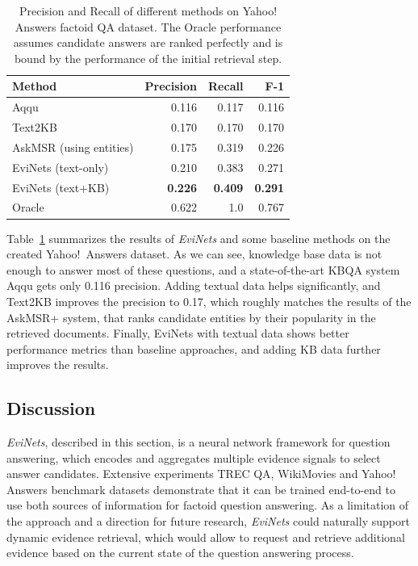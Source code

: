 \begin{table}
\centering
\begin{tabular}{p{6cm}rrr}
Method & Precision & Recall & F-1 \\
\hline
Aqqu & 0.116 & 0.117 & 0.116 \\
Text2KB & 0.170 & 0.170 & 0.170 \\
AskMSR (using entities) & 0.175 & 0.319 & 0.226 \\
\hline
EviNets (text-only) & 0.210 & 0.383 & 0.271 \\
EviNets (text+KB) & \textbf{0.226} & \textbf{0.409} & \textbf{0.291} \\
\hline
Oracle & 0.622 & 1.0 & 0.767 \\
\end{tabular}
\caption{Precision and Recall of different methods on Yahoo! Answers factoid QA dataset. The Oracle performance assumes candidate answers are ranked perfectly and is bound by the performance of the initial retrieval step.}
\label{table:factoid:evinet:eval:yahoo}
\end{table}

Table~\ref{table:factoid:evinet:eval:yahoo} summarizes the results of \textit{EviNets} and some baseline methods on the created Yahoo!~Answers dataset.
As we can see, knowledge base data is not enough to answer most of these questions, and a state-of-the-art KBQA system Aqqu gets only 0.116 precision.
Adding textual data helps significantly, and Text2KB improves the precision to 0.17, which roughly matches the results of the AskMSR+ system, that ranks candidate entities by their popularity in the retrieved documents.
Finally, EviNets with textual data shows better performance metrics than baseline approaches, and adding KB data further improves the results.

\subsection{Discussion}
\label{section:factoid:evinet:discussion}

\textit{EviNets}, described in this section, is a neural network framework for question answering, which encodes and aggregates multiple evidence signals to select answer candidates.
Extensive experiments TREC QA, WikiMovies and Yahoo! Answers benchmark datasets demonstrate that it can be trained end-to-end to use both sources of information for factoid question answering.
As a limitation of the approach and a direction for future research, \textit{EviNets} could naturally support dynamic evidence retrieval, which would allow to request and retrieve additional evidence based on the current state of the question answering process.

